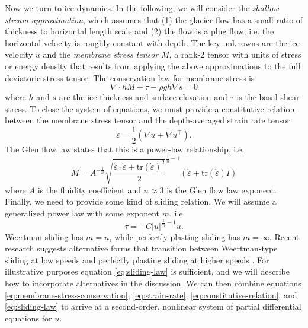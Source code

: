\documentclass{article}
\theoremstyle{definition}
\theoremstyle{plain}
\begin{document}
Now we turn to ice dynamics.
In the following, we will consider the \emph{shallow stream approximation}, which assumes that (1) the glacier flow has a small ratio of thickness to horizontal length scale and (2) the flow is a plug flow, i.e. the horizontal velocity is roughly constant with depth.
The key unknowns are the ice velocity $u$ and the \emph{membrane stress tensor} $M$, a rank-2 tensor with units of stress or energy density that results from applying the above approximations to the full deviatoric stress tensor.
The conservation law for membrane stress is
\begin{equation}
    \nabla\cdot hM + \tau - \rho gh\nabla s = 0
    \label{eq:membrane-stress-conservation}
\end{equation}
where $h$ and $s$ are the ice thickness and surface elevation and $\tau$ is the basal shear stress.
To close the system of equations, we must provide a constitutive relation between the membrane stress tensor and the depth-averaged strain rate tensor
\begin{equation}
    \dot\varepsilon = \frac{1}{2}\left(\nabla u + \nabla u^\top\right).
    \label{eq:strain-rate}
\end{equation}
The Glen flow law states that this is a power-law relationship, i.e.
\begin{equation}
    M = A^{-\frac{1}{n}}\sqrt{\frac{\dot\varepsilon\cdot\dot\varepsilon + \text{tr}(\dot\varepsilon)^2}{2}}^{\frac{1}{n} - 1}\left(\dot\varepsilon + \text{tr}(\dot\varepsilon)I\right)
    \label{eq:constitutive-relation}
\end{equation}
where $A$ is the fluidity coefficient and $n \approx 3$ is the Glen flow law exponent.
Finally, we need to provide some kind of sliding relation.
We will assume a generalized power law with some exponent $m$, i.e.
\begin{equation}
    \tau = -C|u|^{\frac{1}{m} - 1}u.
    \label{eq:sliding-law}
\end{equation}
Weertman sliding has $m = n$, while perfectly plasting sliding has $m = \infty$.
Recent research suggests alternative forms that transition between Weertman-type sliding at low speeds and perfectly plasting sliding at higher speeds \citep{minchew2020toward}.
For illustrative purposes equation \eqref{eq:sliding-law} is sufficient, and we will describe how to incorporate alternatives in the discussion.
We can then combine equations \eqref{eq:membrane-stress-conservation}, \eqref{eq:strain-rate}, \eqref{eq:constitutive-relation}, and \eqref{eq:sliding-law} to arrive at a second-order, nonlinear system of partial differential equations for $u$.
\end{document}
